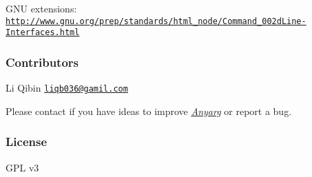 G\+N\+U extensions\+: \href{http://www.gnu.org/prep/standards/html_node/Command_002dLine-Interfaces.html}{\tt http\+://www.\+gnu.\+org/prep/standards/html\+\_\+node/\+Command\+\_\+002d\+Line-\/\+Interfaces.\+html}

\subsubsection*{Contributors}

Li Qibin \href{mailto:liqb036@gamil.com}{\tt liqb036@gamil.\+com}

Please contact if you have ideas to improve {\itshape \hyperlink{class_anyarg}{Anyarg}} or report a bug.

\subsubsection*{License}

G\+P\+L v3 